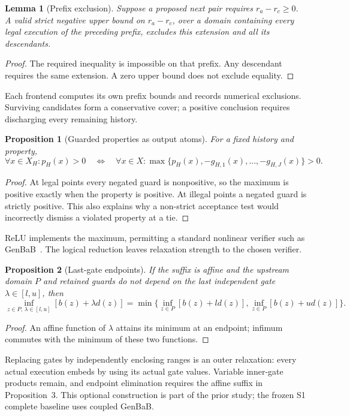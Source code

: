 \documentclass[10pt]{article}
\newtheorem{proposition}{Proposition}
\newtheorem{lemma}{Lemma}
\begin{document}
\begin{lemma}[Prefix exclusion]
Suppose a proposed next pair requires $r_a-r_c\geq0$. A valid strict negative
upper bound on $r_a-r_c$, over a domain containing every legal execution of the
preceding prefix, excludes this extension and all its descendants.
\end{lemma}
\begin{proof}
The required inequality is impossible on that prefix. Any descendant requires
the same extension. A zero upper bound does not exclude equality.
\end{proof}
Each frontend computes its own prefix bounds and records numerical exclusions.
Surviving candidates form a conservative cover; a positive conclusion requires
discharging every remaining history.

\begin{proposition}[Guarded properties as output atoms]
For a fixed history and property,
\[
 \forall x\in X_H:p_H(x)>0\quad\Longleftrightarrow\quad
 \forall x\in X:\max\{p_H(x),-g_{H,1}(x),\ldots,-g_{H,J}(x)\}>0.
\]
\end{proposition}
\begin{proof}
At legal points every negated guard is nonpositive, so the maximum is positive
exactly when the property is positive. At illegal points a negated guard is
strictly positive. This also explains why a non-strict acceptance test would
incorrectly dismiss a violated property at a tie.
\end{proof}
ReLU implements the maximum, permitting a standard nonlinear verifier such as
GenBaB~\cite{genbab}. The logical reduction leaves relaxation strength to the
chosen verifier.

\begin{proposition}[Last-gate endpoints]
If the suffix is affine and the upstream domain $P$ and retained guards do not
depend on the last independent gate $\lambda\in[l,u]$, then
\[
 \inf_{z\in P,\,\lambda\in[l,u]}[b(z)+\lambda d(z)]
 =\min\{\inf_{z\in P}[b(z)+l d(z)],\inf_{z\in P}[b(z)+u d(z)]\}.
\]
\end{proposition}
\begin{proof}
An affine function of $\lambda$ attains its minimum at an endpoint; infimum
commutes with the minimum of these two functions.
\end{proof}
Replacing gates by independently enclosing ranges is an outer relaxation:
every actual execution embeds by using its actual gate values. Variable
inner-gate products remain, and endpoint elimination requires the affine
suffix in Proposition~3. This optional construction is part of the prior
study; the frozen S1 complete baseline uses coupled GenBaB.
\end{document}
